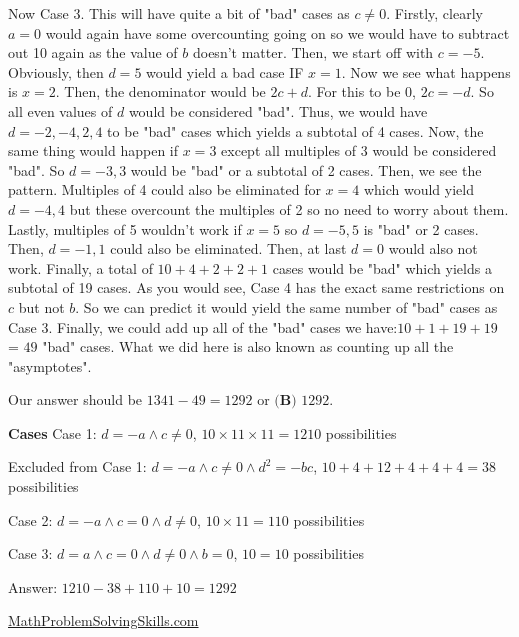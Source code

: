 \begin{enumerate}
 Now Case 3. This will have quite a bit of "bad" cases as ${c \neq 0}$. Firstly, clearly ${a = 0}$ would again have some overcounting going on so we would have to subtract out 10 again as the value of ${b}$ doesn't matter. Then, we start off with ${c = -5}$. Obviously, then ${d = 5}$ would yield a bad case IF ${x = 1}$. Now we see what happens is ${x = 2}$. Then, the denominator would be ${2c + d}$. For this to be 0, ${2c = -d}$. So all even values of ${d}$ would be considered "bad". Thus, we would have ${d = -2, -4, 2, 4}$ to be "bad" cases which yields a subtotal of 4 cases. Now, the same thing would happen if ${x = 3}$ except all multiples of 3 would be considered "bad". So ${d = -3, 3}$ would be "bad" or a subtotal of 2 cases. Then, we see the pattern. Multiples of 4 could also be eliminated for ${x = 4}$ which would yield ${d = -4, 4}$ but these overcount the multiples of 2 so no need to worry about them. Lastly, multiples of 5 wouldn't work if ${x = 5}$ so ${d = -5, 5}$ is "bad" or 2 cases. Then, ${d = -1, 1}$ could also be eliminated. Then, at last ${d = 0}$ would also not work. Finally, a total of ${10 + 4 + 2 + 2 + 1}$ cases would be "bad" which yields a subtotal of 19 cases. As you would see, Case 4 has the exact same restrictions on ${c}$ but not ${b}$. So we can predict it would yield the same number of "bad" cases as Case 3. Finally, we could add up all of the "bad" cases we have:${10 + 1 + 19 + 19}$ = ${49}$ "bad" cases. What we did here is also known as counting up all the "asymptotes". 

 Our answer should be ${1341 - 49 = 1292}$ or $\boxed{\textbf{(B) } 1292}$.

 \textbf{Cases} Case 1: $d=-a\land c\neq0$, $10\times11\times11=1210$ possibilities

 Excluded from Case 1:  $d=-a\land c\neq0\land d^{2}=-bc$, $10+4+12+4+4+4=38$ possibilities

 Case 2: $d=-a\land c=0\land d\neq0$, $10\times11=110$ possibilities

 Case 3: $d=a\land c=0\land d\neq0\land b=0$, $10=10$ possibilities

 Answer: $1210-38+110+10=1292$

 


 \href{https://mathproblemsolvingskills.wordpress.com/}{MathProblemSolvingSkills.com}

 


 


\end{enumerate}